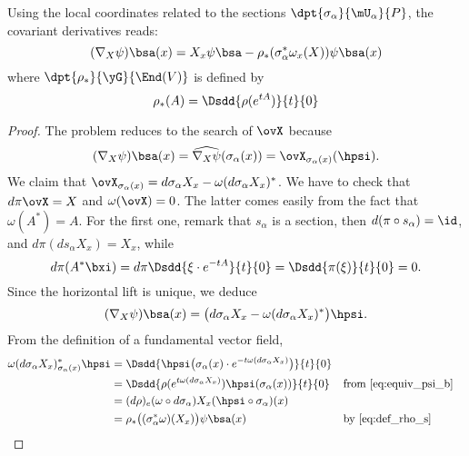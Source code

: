 \begin{theorem}
Using the local coordinates related to the sections $\dpt{\sigma_{\alpha}}{\mU_{\alpha}}{P}$, the covariant derivatives reads:
\begin{equation}\label{eq:nabla_coord}
(\nabla_X\psi)\bsa(x)=X_x\psi\bsa-\rho_*(\sigma_{\alpha}^*\omega_x(X))\psi\bsa(x)
\end{equation}
where $\dpt{\rho_*}{\yG}{\End(V)}$ is defined by
\begin{equation}  \label{eq:def_rho_s}
  \rho_*(A)=\Dsdd{\rho(e^{tA})}{t}{0}
\end{equation}

\end{theorem}

\begin{proof}
The problem reduces to the search of $\ovX$ because
\[
   (\nabla_X\psi)\bsa(x)=\widehat{\nabla_X\psi}(\sigma_{\alpha}(x))=\ovX_{\sigma_{\alpha}(x)}(\hpsi).
\]
We claim that $\ovX_{\sigma_{\alpha}(x)}=d\sigma_{\alpha} X_x-\omega(d\sigma_{\alpha} X_x)^*$. We have to check that $d\pi\ovX=X$ and $\omega(\ovX)=0$. The latter comes easily from the fact that $\omega(A^*)=A$. For the first one, remark that $s_{\alpha}$ is a section, then $d(\pi\circ s_{\alpha})=\id$, and $d\pi(ds_{\alpha} X_x)=X_x$, while
\begin{equation}
  d\pi(A^*\bxi)=d\pi\Dsdd{\xi\cdot e^{-tA}}{t}{0}
               =\Dsdd{\pi(\xi)}{t}{0}
               =0.
\end{equation}
Since the horizontal lift is unique, we deduce
\begin{equation}
  (\nabla_X\psi)\bsa(x)=\big(  d\sigma_{\alpha} X_x-\omega(d\sigma_{\alpha} X_x)^*  \big)\hpsi.
\end{equation}
From the definition of a fundamental vector field,
\begin{equation}
\begin{aligned}
    \omega(d\sigma_{\alpha} X_x)^*_{\sigma_{\alpha}(x)}\hpsi
           &=\Dsdd{\hpsi\big(\sigma_{\alpha}(x)\cdot e^{-t\omega(d\sigma_{\alpha} X_x)}  \big) }{t}{0}\\
           &=\Dsdd{\rho(e^{t\omega(d\sigma_{\alpha} X_x)})\hpsi(\sigma_{\alpha}(x))}{t}{0}&&\text{from \eqref{eq:equiv_psi_b}}\\
           &=(d\rho)_e(\omega\circ d\sigma_{\alpha})X_x(\hpsi\circ\sigma_{\alpha})(x)\\
           &=\rho_*\big( (\sigma_{\alpha}^*\omega)(X_x) \big)\psi\bsa(x)    &&\text{by \eqref{eq:def_rho_s}}
\end{aligned}
\end{equation}

\end{proof}

